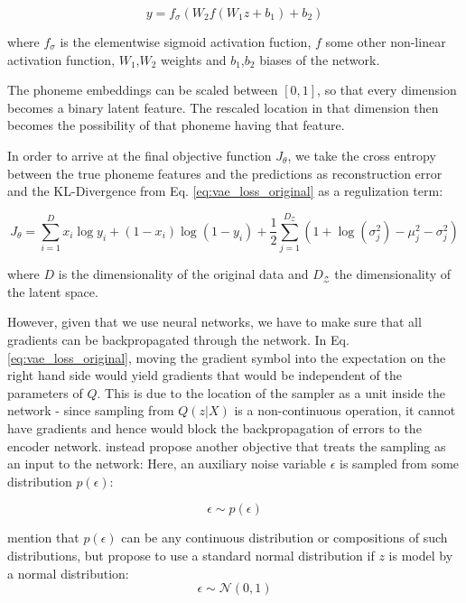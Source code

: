 \documentclass[6pt]{article}
\begin{document}
\begin{equation}
y = f_\sigma (W_2 f(W_1 z + b_1 ) + b_2)
\end{equation}

where $f_\sigma$ is the elementwise sigmoid activation fuction, $f$ some other non-linear activation function, $W_1$,$W_2$ weights and $b_1$,$b_2$ biases of the network.

The phoneme embeddings  can be scaled between $[0,1]$, so that every dimension becomes a binary latent feature. The rescaled location in that dimension then becomes the possibility of that phoneme having that feature. 

In order to arrive at the final objective function $J_\theta$, we take the cross entropy between the true phoneme features and the predictions as reconstruction error and the KL-Divergence from Eq. \ref{eq:vae_loss_original} as a regulization term:

\begin{equation}
J_\theta = \sum_{i=1}^{D} x_i \log y_i + (1-x_i) \log (1-y_i) + \frac{1}{2}\sum_{j=1}^{D_{\mathcal{Z}}}(1+\log(\sigma_j^2)-\mu_j^2-\sigma_j^2)
\end{equation}

where $D$ is the dimensionality of the original data and $D_{\mathcal{Z}}$ the dimensionality of the latent space.

However, given that we use neural networks, we have to make sure that all gradients can be backpropagated through the network. In Eq. \ref{eq:vae_loss_original}, moving the gradient symbol into the expectation on the right hand side would yield gradients that would be independent of the parameters of $Q$. This is due to the location of the sampler as a unit inside the network - since sampling from $Q(z|X)$ is a non-continuous operation, it cannot have gradients and hence would block the backpropagation of errors to the encoder network. \cite{kingma2013auto} instead propose another objective that treats the sampling as an input to the network: Here, an auxiliary noise variable $\epsilon$ is sampled from some distribution $p(\epsilon)$:

\begin{equation}
\epsilon \sim p(\epsilon)
\end{equation}

\cite{kingma2013auto} mention that  $p(\epsilon)$ can be any continuous distribution or compositions of such distributions, but propose to use a standard normal distribution if $z$ is model by a normal distribution:
\begin{equation}
\epsilon \sim \mathcal{N}(0,1)
\end{equation}
\end{document}
